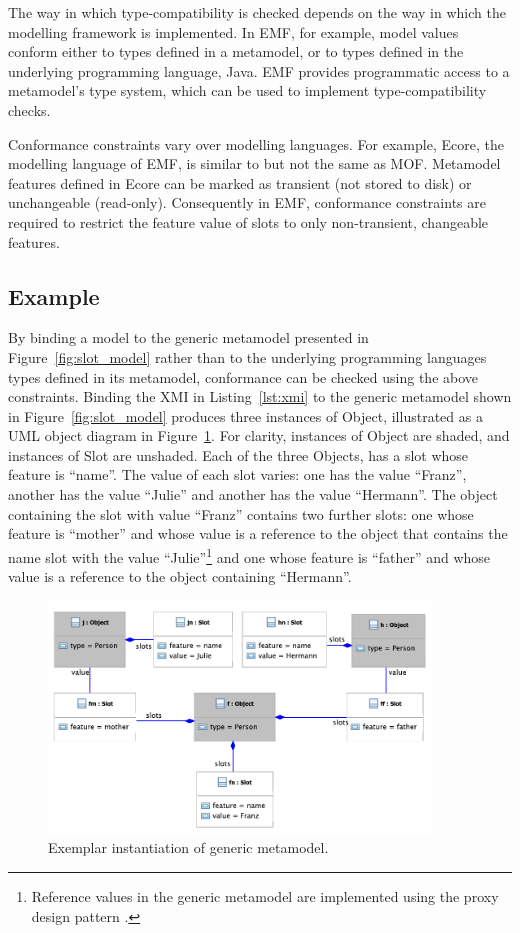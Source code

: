 
The way in which type-compatibility is checked depends on the way in which the modelling framework is implemented. In EMF, for example, model values conform either to types defined in a metamodel, or to types defined in the underlying programming language, Java. EMF provides programmatic access to a metamodel's type system, which can be used to implement type-compatibility checks.

Conformance constraints vary over modelling languages. For example, Ecore, the modelling language of EMF, is similar to but not the same as MOF. Metamodel features defined in Ecore can be marked as transient (not stored to disk) or unchangeable (read-only). Consequently in EMF, conformance constraints are required to restrict the feature value of slots to only non-transient, changeable features.


\subsection{Example}
\label{subsec:mmi_syntax_example}
By binding a model to the generic metamodel presented in Figure~\ref{fig:slot_model} rather than to the underlying programming languages types defined in its metamodel, conformance can be checked using the above constraints. Binding the XMI in Listing~\ref{lst:xmi} to the generic metamodel shown in Figure~\ref{fig:slot_model} produces three instances of Object, illustrated as a UML object diagram in Figure~\ref{fig:generic_binding}. For clarity, instances of Object are shaded, and instances of Slot are unshaded. Each of the three Objects, has a slot whose feature is ``name''. The value of each slot varies: one has the value ``Franz'', another has the value ``Julie'' and another has the value ``Hermann''. The object containing the slot with value ``Franz'' contains two further slots: one whose feature is ``mother'' and whose value is a reference to the object that contains the name slot with the value ``Julie''\footnote{Reference values in the generic metamodel are implemented using the proxy design pattern \cite{gamma95patterns}.} and one whose feature is ``father'' and whose value is a reference to the object containing ``Hermann''. 

\begin{figure}[htbp]
  \centering
  \includegraphics[width=4in]{5.Implementation/GenericBinding.pdf}
  \caption{Exemplar instantiation of generic metamodel.}
  \label{fig:generic_binding}
\end{figure}

